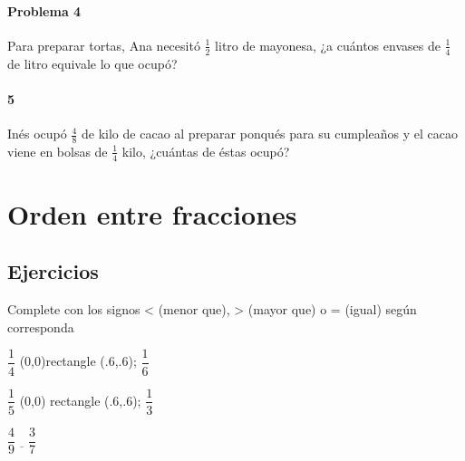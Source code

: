\documentclass[10pt,twoside]{article}
\begin{document}
\paragraph*{Problema 4}
Para preparar tortas, Ana necesitó $\frac{1}{2}$ litro de mayonesa, ¿a cuántos envases de $\frac{1}{4}$ de litro equivale lo que ocup\'{o}?
\paragraph*{5}
Inés ocupó $\frac{4}{8}$ de kilo de cacao al preparar ponqués para su cumpleaños y el cacao viene en bolsas de $\frac{1}{4}$ kilo, ¿cuántas de éstas ocupó?
\section*{Orden entre fracciones}
\subsection*{Ejercicios}
Complete con los signos < (menor que), > (mayor que) o = (igual) según corresponda
\begin{itemize}
\begin{multicols}{3}
\item $\dfrac{1}{4}$ \tikz \draw (0,0)rectangle (.6,.6); $\dfrac{1}{6}$
\item $\dfrac{1}{5}$ \tikz \draw (0,0) rectangle (.6,.6); $\dfrac{1}{3}$
\item $\dfrac{4}{9}\underline{\quad}\dfrac{3}{7}$
\end{multicols}
\end{itemize}
\end{document}
